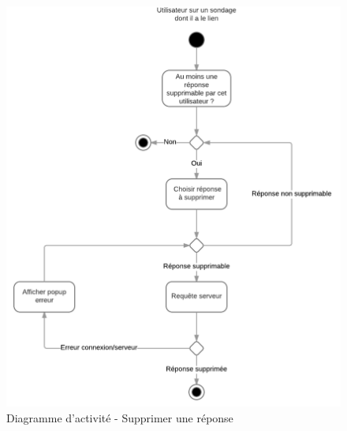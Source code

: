 \documentclass[titlepage]{report}
\begin{document}
\begin{figure}[h]
	\caption{Diagramme d'activité - Supprimer une réponse}
	\label{annexe_diagramme_activite_supprimerReponse}
	\centering
	\includegraphics[width=\textwidth]{figures/diagrammes/activite_supprimerReponse.png}
\end{figure}
\end{document}

